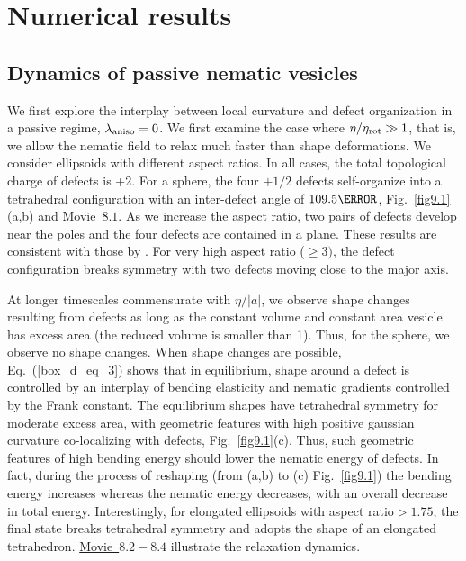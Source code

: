  \section{Numerical results}
 \label{chap8sec3}
 
 \subsection{Dynamics of passive nematic vesicles }
 
We first explore the interplay between local curvature and defect organization in a passive regime, $\lambda_{\rm aniso}=0$. We first examine the case where $\eta /\eta_{\rm rot} \gg 1$, that is, we allow the nematic field to relax much faster than shape deformations. We consider  ellipsoids with different aspect ratios. In all cases, the total topological charge of defects is +2. For a sphere, the four $+1/2$ defects self-organize into a tetrahedral configuration with an inter-defect angle of $109.5 \degree$,  Fig.~\ref{fig9.1}(a,b) and  \href{https://github.com/waleedmirzaPhD/movies_thesis.git}{Movie~$8.1$}. As we increase the aspect ratio, two pairs of defects develop near the poles and the four defects are contained in a plane. These results are consistent with those by \citet{nitschke2020}.
 For very high aspect ratio ($ \ge 3)$, the defect configuration breaks symmetry with two defects moving close to the major axis.  

At longer timescales commensurate with $\eta/|a|$, we observe shape changes resulting from defects as long as the constant volume and constant area vesicle has excess area (the reduced volume is smaller than 1). Thus, for the sphere, we observe no shape changes. When shape changes are possible, Eq.~(\ref{box_d_eq_3}) shows that in equilibrium, shape around a defect is controlled by an interplay of bending elasticity and nematic gradients controlled by the Frank constant. The equilibrium shapes have tetrahedral symmetry for moderate excess area, with geometric features with high positive gaussian curvature co-localizing with defects, Fig.~\ref{fig9.1}(c). Thus, such geometric features of high bending energy should lower the nematic energy of defects. In fact, during the process of reshaping (from (a,b) to (c) Fig.~\ref{fig9.1}) the bending energy increases whereas the nematic energy decreases, with an overall decrease in total energy.  Interestingly, for elongated ellipsoids with aspect ratio$>1.75$, the final state breaks tetrahedral symmetry and adopts the shape of an elongated tetrahedron. \href{https://github.com/waleedmirzaPhD/movies_thesis.git}{Movie~$8.2-8.4$} illustrate the relaxation dynamics.

